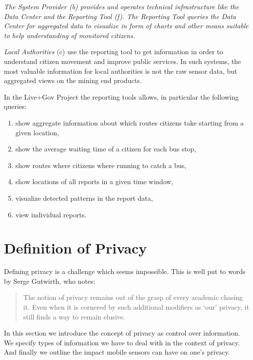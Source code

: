 \documentclass[runningheads,a4paper]{llncs}
\newcommand{\TODO}[1]{\begin{alltt}\textcolor{magenta}{TODO: #1}\end{alltt}}
\newenvironment{LGContent}
{ \par\color{blue} \it \small }
{ \par }
\begin{document}
\begin{LGContent}
The \emph{System Provider} (b) provides and operates technical infrastructure like the Data Center and the \emph{Reporting Tool} (f).
The Reporting Tool queries the Data Center for aggregated data to visualize in form of charts and other means suitable to help understanding of monitored citizens.

\textit{Local Authorities} (c) use the reporting tool to get information in order to understand citizen movement and improve public services.
In such systems, the most valuable information for local authorities is not the raw sensor data, but aggregated views on the mining end products.

In the Live+Gov Project the reporting tools allows, in particular the following queries:
\begin{enumerate}
\item show aggregate information about which routes citizens take starting from a given location,
\item show the average waiting time of a citizen for each bus stop,
\item show routes where citizens where running to catch a bus,
\item show locations of all reports in a given time window,
\item visualize detected patterns in the report data,
\item view individual reports.
\end{enumerate}
\end{LGContent}



\section{Definition of Privacy}
\label{sec:privacydef}


\noindent
Defining privacy is a challenge which seems impossible. This is well put to words by Serge Gutwirth, who notes:
\begin{quote}
The notion of privacy remains out of the grasp of every academic chasing it. Even when it is cornered by such additional modifiers as `our' privacy, it still finds a way to remain elusive. \cite{Gutwirth}
\end{quote}
In this section we introduce the concept of privacy as control over information.
We specify types of information we have to deal with in the context of privacy.
And finally we outline the impact mobile sensors can have on one's privacy.
\end{document}
